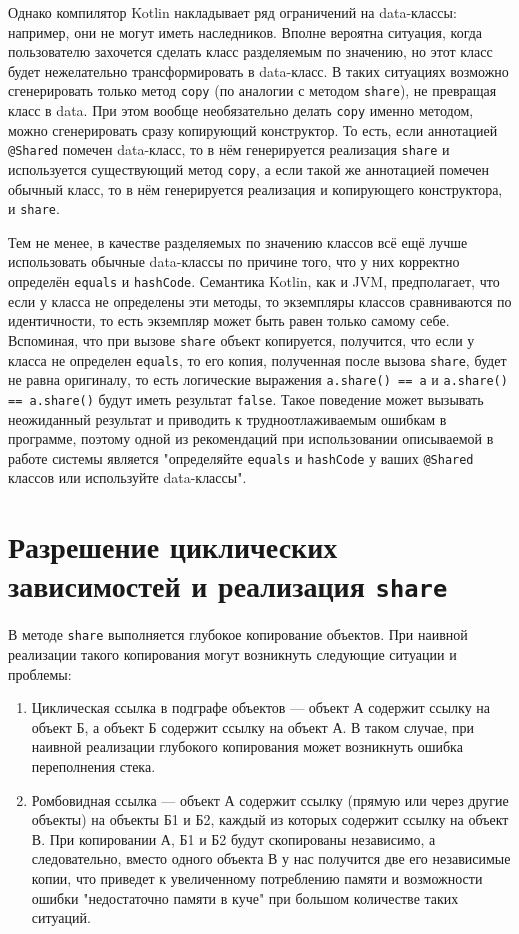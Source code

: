 \documentclass[specification,annotation,times]{itmo-student-thesis}
\begin{document}
Однако компилятор Kotlin накладывает ряд ограничений на data-классы: например, они не могут иметь наследников. Вполне вероятна ситуация, когда пользователю захочется сделать класс разделяемым по значению, но этот класс будет нежелательно трансформировать в data-класс.
В таких ситуациях возможно сгенерировать только метод \texttt{copy} (по аналогии с методом \texttt{share}), не превращая класс в data.
При этом вообще необязательно делать \texttt{copy} именно методом, можно сгенерировать сразу копирующий конструктор.
То есть, если аннотацией \texttt{@Shared} помечен data-класс, то в нём генерируется реализация \texttt{share} и используется существующий метод \texttt{copy}, а если такой же аннотацией помечен обычный класс, то в нём генерируется реализация и копирующего конструктора, и \texttt{share}.

Тем не менее, в качестве разделяемых по значению классов всё ещё лучше использовать обычные data-классы по причине того, что у них корректно определён \texttt{equals} и \texttt{hashCode}. Семантика Kotlin, как и JVM, предполагает, что если у класса не определены эти методы, то экземпляры классов сравниваются по идентичности, то есть экземпляр может быть равен только самому себе.
Вспоминая, что при вызове \texttt{share} объект копируется, получится, что если у класса не определен \texttt{equals}, то его копия, полученная после вызова \texttt{share}, будет не равна оригиналу, то есть логические выражения \texttt{a.share() == a} и \texttt{a.share() == a.share()} будут иметь результат \texttt{false}.
Такое поведение может вызывать неожиданный результат и приводить к трудноотлаживаемым ошибкам в программе, поэтому одной из рекомендаций при использовании описываемой в работе системы является "определяйте \texttt{equals} и \texttt{hashCode} у ваших \texttt{@Shared} классов или используйте data-классы".


\section{Разрешение циклических зависимостей и реализация \texttt{share}}\label{share_cyclic}

В методе \texttt{share} выполняется глубокое копирование объектов. При наивной реализации такого копирования могут возникнуть следующие ситуации и проблемы:

\begin{enumerate}
	\item \label{cyclic} Циклическая ссылка в подграфе объектов --- объект А содержит ссылку на объект Б, а объект Б содержит ссылку на объект А. В таком случае, при наивной реализации глубокого копирования может возникнуть ошибка переполнения стека.
	\item \label{rombic} Ромбовидная ссылка --- объект А содержит ссылку (прямую или через другие объекты) на объекты Б1 и Б2, каждый из которых содержит ссылку на объект В. При копировании А, Б1 и Б2 будут скопированы независимо, а следовательно, вместо одного объекта В у нас получится две его независимые копии, что приведет к увеличенному потреблению памяти и возможности ошибки "недостаточно памяти в куче" при большом количестве таких ситуаций.
\end{enumerate}
\end{document}
